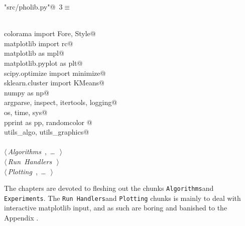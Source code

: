 \documentclass[10pt, english, oneside]{report}
\begin{document}
\begin{flushleft} \small\label{scrap1}\raggedright\small
{} \verb@"src/pholib.py"@\nobreak\ {\footnotesize {3}}$\equiv$
\vspace{-1ex}
\begin{list}{}{} \item
\mbox{}\verb@@\\
\mbox{}\verb@from colorama import Fore, Style@\\
\mbox{}\verb@from matplotlib import rc@\\
\mbox{}\verb@import matplotlib as mpl@\\
\mbox{}\verb@import matplotlib.pyplot as plt@\\
\mbox{}\verb@from scipy.optimize import minimize@\\
\mbox{}\verb@from sklearn.cluster import KMeans@\\
\mbox{}\verb@import numpy as np@\\
\mbox{}\verb@import argparse, inspect, itertools, logging@\\
\mbox{}\verb@import os, time, sys@\\
\mbox{}\verb@import pprint as pp, randomcolor @\\
\mbox{}\verb@import utils_algo, utils_graphics@\\
\mbox{}\verb@@\\
\mbox{}\verb@@\hbox{$\langle\,${\itshape Algorithms}\nobreak\ {\footnotesize {}, \ldots\ }$\,\rangle$}\verb@@\\
\mbox{}\verb@@\hbox{$\langle\,${\itshape Run Handlers}\nobreak\ {\footnotesize {}}$\,\rangle$}\verb@@\\
\mbox{}\verb@@\hbox{$\langle\,${\itshape Plotting}\nobreak\ {\footnotesize {}, \ldots\ }$\,\rangle$}\verb@@\\
\mbox{}\verb@@{\NWsep}
\end{list}
\vspace{-1.5ex}
\footnotesize
\begin{list}{}{\setlength{\itemsep}{-\parsep}\setlength{\itemindent}{-\leftmargin}}

\item{}
\end{list}
\vspace{4ex}
\end{flushleft}

The chapters are devoted to fleshing out the chunks \textlangle \verb|Algorithms|\textrangle and 
\textlangle\verb|Experiments|\textrangle.  The \newline \textlangle \verb|Run Handlers|\textrangle and 
\textlangle \verb|Plotting|\textrangle \; chunks is mainly to deal with interactive matplotlib input, 
and as such are boring and banished to the Appendix \Winkey . 
\end{document}
